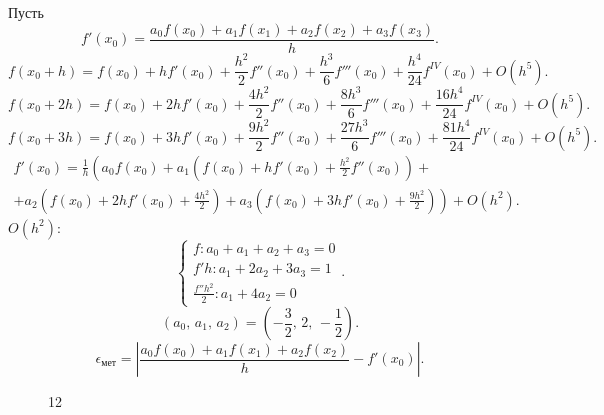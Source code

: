 \documentclass[a4paper]{article}
\begin{document}
\begin{sol}
	Пусть
	\[
		f'(x_0)=
		\frac{a_0 f(x_0) + a_1 f(x_1)+ a_2 f(x_2)+ a_3
		f(x_3)}{h}
	.\] 
	\[
		f(x_0+h)= f(x_0)+ h f'(x_0)+\frac{h^2}{2}
		f''(x_0) + \frac{h^3}{6} f'''(x_0)+
		\frac{h^4}{24} f^{IV} (x_0) + O(h^5)
	.\] 
	\[
		f(x_0+2h)= f(x_0)+ 2h f'(x_0)+\frac{4h^2}{2}
		f''(x_0) + \frac{8h^3}{6} f'''(x_0)+
		\frac{16h^4}{24} f^{IV} (x_0) + O(h^5)
	.\] 
	\[
		f(x_0+3h)= f(x_0)+ 3h f'(x_0)+\frac{9h^2}{2}
		f''(x_0) + \frac{27h^3}{6} f'''(x_0)+
		\frac{81h^4}{24} f^{IV} (x_0) + O(h^5)
	.\] 
	\begin{multline*}
		f'(x_0)= \frac{1}{h}\left( 
		a_0 f (x_0) + a_1 \left( f(x_0)+h f'(x_0)+
	\frac{h^2}{2} f''(x_0)\right)\right. +\\ \left.+a_2\left( f(x_0)+ 2h f'(x_0)+\frac{4h^2}{2} \right) + a_3\left(f(x_0)+ 3h f'(x_0)+\frac{9h^2}{2}\right)\right) +O(h^2)
	.\end{multline*} 
	$O(h^2)$:
	\[
	\left\{
	\begin{aligned}
	f: a_0+a_1+a_2+a_3=0\\
	f' h : a_1+2a_2+3a_3=1\\
	\frac{f'' h^2}{2}: a_1+4a_2=0
	\end{aligned}
	\right.
	.\] 
 \[
	 (a_0,\,a_1,\,a_2)= \left( -\frac{3}{2},\, 2,\,-\frac{1}{2} \right) 
.\] 
\[
\epsilon_\text{мет}= \left| 
\frac{a_0 f(x_0) + a_1 f(x_1)+ a_2 f(x_2)}{h}-f'(x_0)
\right| 
.\] 
\end{sol}
\begin{figure}[ht]
    \centering
    \caption{12}
    \label{fig:12}
\end{figure}
\end{document}
